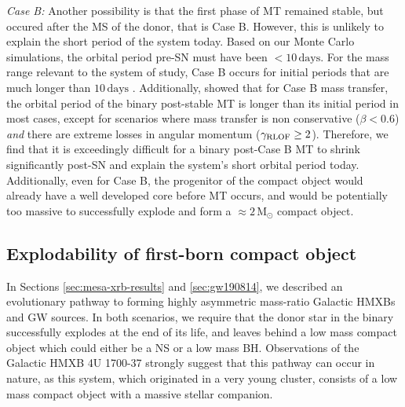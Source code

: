 \documentclass[linenumbers,trackchanges,twocolumn]{aastex701}
\newcommand{\Mdot}{\mathrm{M}_{\odot}}
\begin{document}
\textit{Case B:} Another possibility is that the first phase of MT remained stable, but
occured after the MS of the donor, that is Case B.
However, this is unlikely to explain the short period of the system today. Based on our Monte Carlo simulations, the orbital period pre-SN must have been $<10\,\mathrm{days}$. For the mass range relevant to the system of study, Case B occurs for initial periods that are much longer than $10\,\mathrm{days}$ \citep[e.g.,][]{2023A&A...672A.198S}. Additionally, \cite{2019A&A...624A..66R} showed that for Case B mass transfer, the orbital period of the binary post-stable MT is longer than its initial period in most cases, except for scenarios where mass transfer is non conservative ($\beta < 0.6$) \textit{and} there are extreme losses in angular momentum ($\gamma_{\rm RLOF} \geq 2$). Therefore, we find that it is exceedingly difficult for a binary post-Case B MT to shrink significantly post-SN and explain the system's short orbital period today. Additionally, even for Case B, the progenitor of the compact object would already have a well developed core before MT occurs, and would be potentially too massive to successfully explode and form a $\approx 2\,\Mdot$ compact object.

\subsection{Explodability of first-born compact object}\label{sec:explodability}

In Sections \ref{sec:mesa-xrb-results} and \ref{sec:gw190814}, we
described an evolutionary pathway to forming highly
asymmetric mass-ratio Galactic HMXBs and GW sources. In both scenarios, we require that the donor star in the binary successfully explodes at the end of its life, and leaves behind a
low mass compact object which could either be a NS or a low mass BH. Observations of the Galactic HMXB 4U 1700-37 strongly suggest that this pathway can occur in nature, as this system, which originated in a very young cluster, consists of a low mass compact object with a massive stellar companion.
\end{document}
